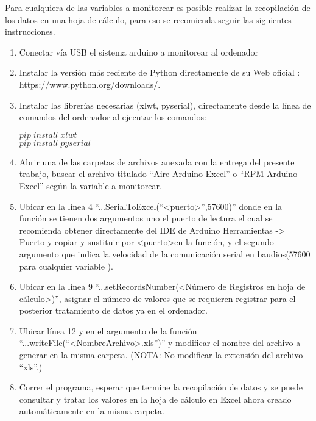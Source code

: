 \documentclass[11pt,letter
								]
								{article}
\begin{document}
Para cualquiera de las  variables a monitorear es posible realizar la recopilación de los datos en una hoja de cálculo, para eso se recomienda seguir las siguientes instrucciones.  \begin{enumerate}
\item Conectar vía  USB el sistema arduino a monitorear al ordenador 
\item Instalar la versión más reciente de Python  directamente de su Web oficial :\\ https://www.python.org/downloads/.
\item Instalar las librerías necesarias (xlwt,  pyserial), directamente desde la línea de comandos del ordenador al ejecutar los comandos: \begin{center}$ pip \;install\; xlwt$ \\
$ pip \;install \;pyserial$\end{center}

\item Abrir una de las  carpetas de archivos  anexada con la entrega del presente trabajo, buscar el archivo titulado ``Aire-Arduino-Excel'' o ``RPM-Arduino-Excel'' según la variable a monitorear. 

\item  Ubicar en la línea 4 ``...SerialToExcel(``<puerto>'',57600)'' donde en la función se tienen dos argumentos uno el puerto de lectura el cual se recomienda obtener directamente del IDE de Arduino Herramientas -> Puerto y copiar y sustituir por <puerto>en la función, y el segundo argumento que indica la velocidad de la comunicación serial  en baudios(57600 para cualquier variable ).
\item Ubicar en la línea 9 ``...setRecordsNumber(<Número de Registros en hoja de cálculo>)'', asignar el número de valores que se requieren registrar para el posterior tratamiento de datos ya en el ordenador.
\item Ubicar línea 12 y en el argumento de la función ``...writeFile(``<NombreArchivo>.xls'')'' y modificar el nombre del archivo a  generar  en la misma carpeta. (NOTA: No modificar la extensión del archivo ``xls''.)

\item Correr el programa, esperar que termine la recopilación de datos y se puede consultar y tratar los valores en la hoja de cálculo en Excel ahora creado automáticamente en la misma carpeta. 

\end{enumerate}
\end{document}
